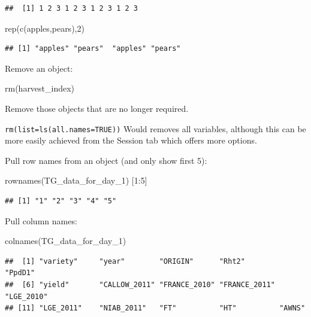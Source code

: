 \documentclass[
]{book}
\newenvironment{Shaded}{\begin{snugshade}}{\end{snugshade}}
\newcommand{\DecValTok}[1]{\textcolor[rgb]{0.00,0.00,0.81}{#1}}
\newcommand{\FunctionTok}[1]{\textcolor[rgb]{0.00,0.00,0.00}{#1}}
\newcommand{\NormalTok}[1]{#1}
\newcommand{\SpecialCharTok}[1]{\textcolor[rgb]{0.00,0.00,0.00}{#1}}
\newcommand{\StringTok}[1]{\textcolor[rgb]{0.31,0.60,0.02}{#1}}
\begin{document}
\begin{verbatim}
##  [1] 1 2 3 1 2 3 1 2 3 1 2 3
\end{verbatim}

\begin{Shaded}
\begin{Highlighting}[]
\FunctionTok{rep}\NormalTok{(}\FunctionTok{c}\NormalTok{(}\StringTok{\textquotesingle{}apples\textquotesingle{}}\NormalTok{,}\StringTok{\textquotesingle{}pears\textquotesingle{}}\NormalTok{),}\DecValTok{2}\NormalTok{)}
\end{Highlighting}
\end{Shaded}

\begin{verbatim}
## [1] "apples" "pears"  "apples" "pears"
\end{verbatim}

Remove an object:

\begin{Shaded}
\begin{Highlighting}[]
\FunctionTok{rm}\NormalTok{(harvest\_index)}
\end{Highlighting}
\end{Shaded}

Remove those objects that are no longer required.

\texttt{rm(list=ls(all.names=TRUE))} Would removes all variables, although this can be more easily achieved from the Session tab which offers more options.

Pull row names from an object (and only show first 5):

\begin{Shaded}
\begin{Highlighting}[]
\FunctionTok{rownames}\NormalTok{(TG\_data\_for\_day\_1)  [}\DecValTok{1}\SpecialCharTok{:}\DecValTok{5}\NormalTok{]}
\end{Highlighting}
\end{Shaded}

\begin{verbatim}
## [1] "1" "2" "3" "4" "5"
\end{verbatim}

Pull column names:

\begin{Shaded}
\begin{Highlighting}[]
\FunctionTok{colnames}\NormalTok{(TG\_data\_for\_day\_1)}
\end{Highlighting}
\end{Shaded}

\begin{verbatim}
##  [1] "variety"     "year"        "ORIGIN"      "Rht2"        "PpdD1"      
##  [6] "yield"       "CALLOW_2011" "FRANCE_2010" "FRANCE_2011" "LGE_2010"   
## [11] "LGE_2011"    "NIAB_2011"   "FT"          "HT"          "AWNS"
\end{verbatim}
\end{document}
